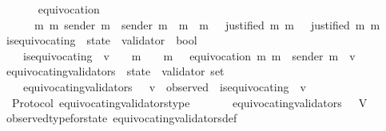 \begin{isabellebody}
\ \ \isanewline
\ \ \ \ {\isachardoublequoteopen}equivocation\ {\isacharequal}\isanewline
\ \ \ \ \ \ {\isacharparenleft}{\isasymlambda}{\isacharparenleft}m{}{\isacharcomma}\ m{}{\isacharparenright}{\isachardot}\ sender\ m{}\ {\isacharequal}\ sender\ m{}\ {\isasymand}\ m{}\ {\isasymnoteq}\ m{}\ {\isasymand}\ {\isasymnot}\ {\isacharparenleft}justified\ m{}\ m{}{\isacharparenright}\ {\isasymand}\ {\isasymnot}\ {\isacharparenleft}justified\ m{}\ m{}{\isacharparenright}{\isacharparenright}{\isachardoublequoteclose}\isanewline
\isanewline
\isanewline
{}\isamarkupfalse%
\ is{\isacharunderscore}equivocating\ {\isacharcolon}{\isacharcolon}\ {\isachardoublequoteopen}state\ {\isasymRightarrow}\ validator\ {\isasymRightarrow}\ bool{\isachardoublequoteclose}\isanewline
\ \ \isanewline
\ \ \ \ {\isachardoublequoteopen}is{\isacharunderscore}equivocating\ {\isasymsigma}\ v\ {\isacharequal}\ \ {\isacharparenleft}{\isasymexists}\ m{}\ {\isasymin}\ {\isasymsigma}{\isachardot}\ {\isasymexists}\ m{}\ {\isasymin}\ {\isasymsigma}{\isachardot}\ equivocation\ {\isacharparenleft}m{}{\isacharcomma}\ m{}{\isacharparenright}\ {\isasymand}\ sender\ m{}\ {\isacharequal}\ v{\isacharparenright}{\isachardoublequoteclose}\isanewline
\isanewline
{}\isamarkupfalse%
\ equivocating{\isacharunderscore}validators\ {\isacharcolon}{\isacharcolon}\ {\isachardoublequoteopen}state\ {\isasymRightarrow}\ validator\ set{\isachardoublequoteclose}\isanewline
\ \ \isanewline
\ \ \ \ {\isachardoublequoteopen}equivocating{\isacharunderscore}validators\ {\isasymsigma}\ {\isacharequal}\ {\isacharbraceleft}v\ {\isasymin}\ observed\ {\isasymsigma}{\isachardot}\ is{\isacharunderscore}equivocating\ {\isasymsigma}\ v{\isacharbraceright}{\isachardoublequoteclose}\isanewline
\isanewline
{}\isamarkupfalse%
\ {\isacharparenleft}\ Protocol{\isacharparenright}\ equivocating{\isacharunderscore}validators{\isacharunderscore}type\ {\isacharcolon}\isanewline
\ \ {\isachardoublequoteopen}{\isasymforall}\ {\isasymsigma}\ {\isasymin}\ {\isasymSigma}{\isachardot}\ equivocating{\isacharunderscore}validators\ {\isasymsigma}\ {\isasymsubseteq}\ V{\isachardoublequoteclose}\isanewline
%
\isadelimproof
\ \ %
\endisadelimproof
%
\isatagproof
{}\isamarkupfalse%
\ observed{\isacharunderscore}type{\isacharunderscore}for{\isacharunderscore}state\ equivocating{\isacharunderscore}validators{\isacharunderscore}def\ \isamarkupfalse%

\end{isabellebody}
